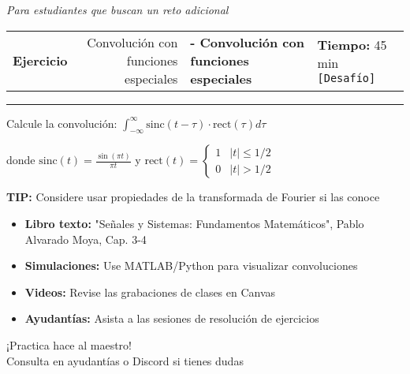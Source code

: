 \documentclass[11pt]{article}
\makeatletter
\newcommand{\desafio}{\texttt{[Desafío]}}
\newcounter{ejercicio}
\newenvironment{ejercicio}[3][]{%
  \stepcounter{ejercicio}
  \vspace{0.6cm}
  \noindent\begin{tabularx}{\linewidth}{@{} X r @{}}
    \textbf{Ejercicio \theejercicio} \ifx&#1&\else\textbf{ - #1}\fi
    &
    \textbf{Tiempo:} #2 min \quad #3
  \end{tabularx}
  \hrule
  \vspace{0.3cm}
}{%
  \vspace{0.5cm}
}
\newcommand{\tip}[1]{%
  \begin{tcolorbox}[
    colback=black!5,
    colframe=black!60,
    boxrule=1pt,
    rounded corners=3pt,
    left=8pt,
    right=8pt,
    top=5pt,
    bottom=5pt
  ]
  \textbf{TIP:} #1
  \end{tcolorbox}
}
\newcommand{\espaciotrabajo}[1][5cm]{\vspace{#1}}
\newenvironment{grupoejercicio}[2]{%
  \vspace{0.8cm}
  \begin{tcolorbox}[
    enhanced,
    colback=black!5,
    colframe=black,
    boxrule=1pt,
    rounded corners=8pt,
    title={\textbf{#1}},
    fonttitle=\Large\bfseries
  ]
  \textit{#2}
  \end{tcolorbox}
  \vspace{0.3cm}
}{%
  \vspace{0.5cm}
}
\makeatother
\begin{document}
\begin{grupoejercicio}{Problemas Desafío}{Para estudiantes que buscan un reto adicional}

\begin{ejercicio}[Convolución con funciones especiales]{45}{\desafio}
  Calcule la convolución:
  $\int_{-\infty}^{\infty} \text{sinc}(t-\tau) \cdot \text{rect}(\tau) d\tau$
  
  donde $\text{sinc}(t) = \frac{\sin(\pi t)}{\pi t}$ y $\text{rect}(t) = \begin{cases} 1 & |t| \leq 1/2 \\ 0 & |t| > 1/2 \end{cases}$
  
  \tip{Considere usar propiedades de la transformada de Fourier si las conoce}
  
  \espaciotrabajo[8cm]
\end{ejercicio}

\end{grupoejercicio}

\begin{tcolorbox}[
  enhanced,
  colback=black!5,
  colframe=black,
  boxrule=1pt,
  rounded corners=8pt,
  title={\textbf{📖 RECURSOS ADICIONALES}},
  fonttitle=\bfseries
]
\begin{itemize}
  \item \textbf{Libro texto:} "Señales y Sistemas: Fundamentos Matemáticos", Pablo Alvarado Moya, Cap. 3-4
  \item \textbf{Simulaciones:} Use MATLAB/Python para visualizar convoluciones
  \item \textbf{Videos:} Revise las grabaciones de clases en Canvas
  \item \textbf{Ayudantías:} Asista a las sesiones de resolución de ejercicios
\end{itemize}
\end{tcolorbox}

\vfill
\begin{center}
  \vspace{0.3cm}
  
  {\large ¡Practica hace al maestro!}\\
  {\small Consulta en ayudantías o Discord si tienes dudas}
\end{center}
\end{document}
